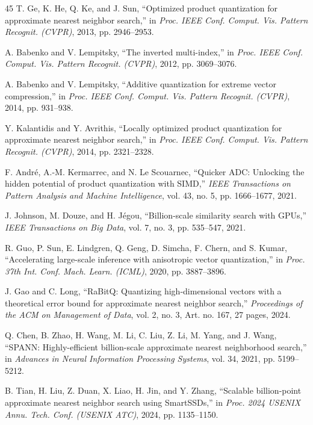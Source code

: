 \begin{thebibliography}{45}
T. Ge, K. He, Q. Ke, and J. Sun, ``Optimized product quantization for approximate nearest neighbor search,'' in \emph{Proc. IEEE Conf. Comput. Vis. Pattern Recognit. (CVPR)}, 2013, pp. 2946--2953.

A. Babenko and V. Lempitsky, ``The inverted multi-index,'' in \emph{Proc. IEEE Conf. Comput. Vis. Pattern Recognit. (CVPR)}, 2012, pp. 3069--3076.

A. Babenko and V. Lempitsky, ``Additive quantization for extreme vector compression,'' in \emph{Proc. IEEE Conf. Comput. Vis. Pattern Recognit. (CVPR)}, 2014, pp. 931--938.

Y. Kalantidis and Y. Avrithis, ``Locally optimized product quantization for approximate nearest neighbor search,'' in \emph{Proc. IEEE Conf. Comput. Vis. Pattern Recognit. (CVPR)}, 2014, pp. 2321--2328.

F. Andr\'e, A.-M. Kermarrec, and N. Le Scouarnec, ``Quicker ADC: Unlocking the hidden potential of product quantization with SIMD,'' \emph{IEEE Transactions on Pattern Analysis and Machine Intelligence}, vol. 43, no. 5, pp. 1666--1677, 2021.

J. Johnson, M. Douze, and H. J\'egou, ``Billion-scale similarity search with GPUs,'' \emph{IEEE Transactions on Big Data}, vol. 7, no. 3, pp. 535--547, 2021.

R. Guo, P. Sun, E. Lindgren, Q. Geng, D. Simcha, F. Chern, and S. Kumar, ``Accelerating large-scale inference with anisotropic vector quantization,'' in \emph{Proc. 37th Int. Conf. Mach. Learn. (ICML)}, 2020, pp. 3887--3896.

J. Gao and C. Long, ``RaBitQ: Quantizing high-dimensional vectors with a theoretical error bound for approximate nearest neighbor search,'' \emph{Proceedings of the ACM on Management of Data}, vol. 2, no. 3, Art. no. 167, 27 pages, 2024.

Q. Chen, B. Zhao, H. Wang, M. Li, C. Liu, Z. Li, M. Yang, and J. Wang, ``SPANN: Highly-efficient billion-scale approximate nearest neighborhood search,'' in \emph{Advances in Neural Information Processing Systems}, vol. 34, 2021, pp. 5199--5212.

B. Tian, H. Liu, Z. Duan, X. Liao, H. Jin, and Y. Zhang, ``Scalable billion-point approximate nearest neighbor search using SmartSSDs,'' in \emph{Proc. 2024 USENIX Annu. Tech. Conf. (USENIX ATC)}, 2024, pp. 1135--1150.


\end{thebibliography}
